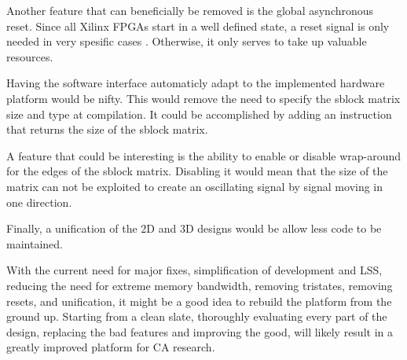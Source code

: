 Another feature that can beneficially be removed is the global asynchronous reset.
Since all Xilinx FPGAs start in a well defined state, a reset signal is only needed in very spesific cases \cite{ug687} \cite{wp272}.
Otherwise, it only serves to take up valuable resources.

Having the software interface automaticly adapt to the implemented hardware platform would be nifty.
This would remove the need to specify the sblock matrix size and type at compilation.
It could be accomplished by adding an instruction that returns the size of the sblock matrix.

A feature that could be interesting is the ability to enable or disable wrap-around for the edges of the sblock matrix.
Disabling it would mean that the size of the matrix can not be exploited to create an oscillating signal by signal moving in one direction.


Finally, a unification of the 2D and 3D designs would be allow less code to be maintained.

With the current need for major fixes, simplification of development and LSS, reducing the need for extreme memory bandwidth, removing tristates, removing resets, and unification, it might be a good idea to rebuild the platform from the ground up.
Starting from a clean slate, thoroughly evaluating every part of the design, replacing the bad features and improving the good, will likely result in a greatly improved platform for CA research.

